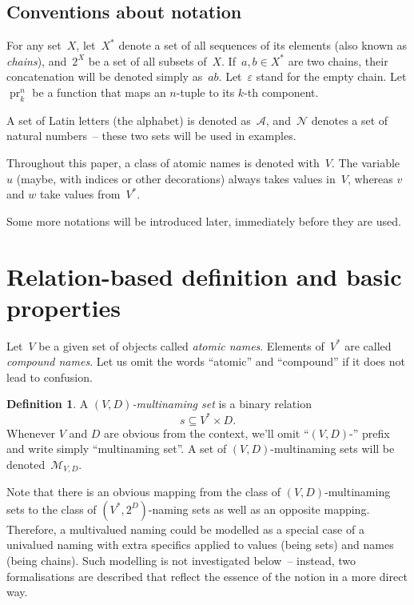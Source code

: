 \documentclass{article}
\theoremstyle{definition}
\newtheorem{Df}{Definition}
\newcommand{\setcharmvcn}{M}
\newcommand{\setsymbol}[3]{\mathcal{#1}_{#2,#3}}
\newcommand{\setmvcn}[2]{\setsymbol{\setcharmvcn}{#1}{#2}}
\newcommand{\seta}{\mathcal{A}}
\newcommand{\setn}{\mathcal{N}}
\newcommand{\proj}[2]{\operatorname{pr}^{#1}_{#2}}
\begin{document}
\subsection*{Conventions about notation}

For any set~$X$, let~$X^\ast$ denote a set of all sequences of its elements
(also known as \emph{chains}), and~$2^X$ be a set of all subsets of~$X$.
If~$a,b\in X^\ast$ are two chains, their concatenation will be denoted simply
as~$ab$. Let~$\varepsilon$ stand for the empty chain.
Let $\proj{n}{k}$ be a function that maps an $n$-tuple to its $k$-th component.

A set of Latin letters (the alphabet) is denoted as~$\seta$,
and~$\setn$ denotes a set of natural numbers~-- these two sets will be
used in examples.

Throughout this paper, a class of atomic names is denoted with~$V$. The
variable~$u$ (maybe, with indices or other decorations) always takes values
in~$V$, whereas $v$ and $w$ take values from~$V^\ast$.

Some more notations will be introduced later, immediately before they are used.



\section{Relation-based definition and basic properties}

Let~$V$ be a given set of objects called \emph{atomic names}. Elements
of~$V^\ast$ are called \emph{compound names}. Let us omit the words ``atomic''
and ``compound'' if it does not lead to confusion.

\begin{Df}\label{df:mvcn}
A \emph{$(V,D)$-multinaming set} is a binary relation
\[
  s \subseteq V^\ast \times D .
\]
Whenever $V$ and $D$ are obvious from the context, we'll omit ``$(V,D)$-''
prefix and write simply ``multinaming set''. A set of $(V,D)$-multinaming sets will be
denoted~$\setmvcn{V}{D}$.
\end{Df}

Note that there is an obvious mapping from the class of $(V,D)$-multinaming
sets to the class of $(V^\ast, 2^D)$-naming sets as well as an opposite
mapping. Therefore, a multivalued naming could be modelled as a special case of
a univalued naming with extra specifics applied to values (being sets) and
names (being chains). Such modelling is not investigated below~-- instead, two
formalisations are described that reflect the essence of the notion in a more
direct way.
\end{document}
